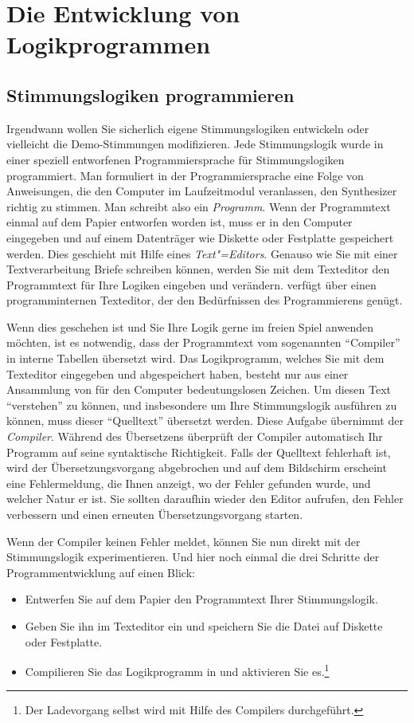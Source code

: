 \chapter{Die Entwicklung von Logikprogrammen}\label{cha:die-entwicklung-von}

\section{Stimmungslogiken programmieren}\label{sec:stimm-progr}

Irgendwann wollen Sie sicherlich eigene Stimmungslogiken entwickeln
oder vielleicht die Demo-Stimmungen modifizieren. Jede Stimmungslogik
wurde in einer speziell entworfenen Programmiersprache für
Stimmungslogiken programmiert. Man formuliert in
der Programmiersprache eine Folge von
Anweisungen, die den Computer im Laufzeitmodul veranlassen, den
Synthesizer richtig zu stimmen. Man schreibt also ein \emph{Programm}.
Wenn der Programmtext einmal auf dem Papier entworfen worden ist, muss
er in den Computer eingegeben und auf einem Datenträger wie Diskette
oder Festplatte gespeichert werden. Dies geschieht mit Hilfe eines
\emph{Text"=Editors}. Genauso wie Sie mit einer Textverarbeitung Briefe
schreiben können, werden Sie mit dem Texteditor den Programmtext für
Ihre Logiken eingeben und verändern. \mutabor{} verfügt über einen
programminternen Texteditor, der den Bedürfnissen des Programmierens
genügt.

Wenn dies geschehen ist und Sie Ihre Logik gerne im freien Spiel
anwenden möchten, ist es notwendig, dass der Programmtext vom
sogenannten "`Compiler"' in interne Tabellen übersetzt wird. Das
Logikprogramm, welches Sie mit dem Texteditor eingegeben und
abgespeichert haben, besteht nur aus einer Ansammlung von für den
Computer bedeutungslosen Zeichen. Um diesen Text "`verstehen"' zu
können, und insbesondere um Ihre Stimmungslogik ausführen zu können,
muss dieser "`Quelltext"' übersetzt werden.  Diese Aufgabe übernimmt
der \emph{Compiler}. Während des Übersetzens überprüft der Compiler
automatisch Ihr Programm auf seine syntaktische Richtigkeit. Falls der
Quelltext fehlerhaft ist, wird der Übersetzungsvorgang abgebrochen und
auf dem Bildschirm erscheint eine Fehlermeldung, die Ihnen anzeigt, wo
der Fehler gefunden wurde, und welcher Natur er ist. Sie sollten
daraufhin wieder den Editor aufrufen, den Fehler verbessern und einen
erneuten Übersetzungsvorgang  starten.

Wenn der Compiler keinen Fehler meldet, können Sie nun direkt mit der Stimmungslogik
experimentieren. Und
hier noch einmal die drei Schritte der Programmentwicklung auf
einen Blick:
\begin{itemize}
\item Entwerfen Sie auf dem Papier den Programmtext Ihrer
  Stimmungslogik.
\item Geben Sie ihn im Texteditor ein und speichern Sie die Datei auf
  Diskette oder Festplatte.
\item Compilieren Sie das Logikprogramm in \mutabor{} und aktivieren Sie
  es.\footnote{Der Ladevorgang selbst wird mit Hilfe des Compilers
    durchgeführt.}
\end{itemize}

